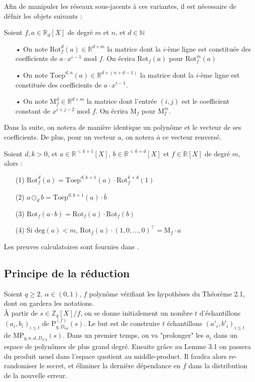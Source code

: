 \documentclass[11pt,a4paper]{article}
\begin{document}
Afin de manipuler les réseaux sous-jacents à ces variantes, il est nécessaire de défnir les objets suivants : 

\begin{defin} Soient $f,a\in \mathbb{R}_d[X]$ de degré $m$ et $n$, et $d \in \mathbb{N}$
\begin{enumerate}
\item[•] On note $\text{Rot}^d_f(a) \in \mathbb{R}^{d\times m}$ la matrice dont la $i$-ème ligne est constituée des coefficients de $a\cdot x^{i-1}\text{ mod } f$. On écrira $\text{Rot}_f(a)$ pour  $\text{Rot}^m_f(a)$
\item[•] On note $\text{Toep}^{d,n}(a) \in \mathbb{R}^{d\times(n+d-1)}$ la matrice dont la $i$-ème ligne est constituée des coefficients de $a\cdot x^{i-1}$.
\item[•] On note $\text{M}_f^d \in \mathbb{R}^{d\times m}$ la matrice dont l'entrée $(i,j)$ est le coefficient constant de $x^{i+j-2}\text{ mod }f$. On écrira $\text{M}_f$ pour  $\text{M}_f^m$.
\end{enumerate}
\end{defin}


Dans la suite, on notera de manière identique un polynôme et le vecteur de ses coefficients. De plus, pour un vecteur $a$, on notera $\bar a$ ce vecteur renversé. \\
\begin{lemma} Soient $d,k >0$, et $a \in \mathbb{R}^{<k+1}[X]$, $b \in \mathbb{R}^{<k+d}[X]$ et $f \in \mathbb{R}[X]$ de degré $m$, alors :
\begin{enumerate}
\item[(1)]$\text{Rot}^d_f(a) = \text{Toep}^{d,k+1}(a)\cdot\text{Rot}^{k+d}_f(1)$
\item[(2)] $a\odot_d b = \overline{\text{Toep}^{d,k+1}(a)\cdot \bar{b}}$
\item[(3)] $\text{Rot}_f(a\cdot b)=\text{Rot}_f(a)\cdot\text{Rot}_f(b)$
\item[(4)] Si $\text{deg}(a) < m$, $\text{Rot}_f(a)\cdot(1,0,\dots,0)^\top = \text{M}_f\cdot a$
\end{enumerate}
\end{lemma}
Les preuves calculatoires sont fournies dans \cite{mplwe}.

\subsection{Principe de la réduction}
Soient $q \geq 2$, $\alpha \in (0,1)$, $f$ polynôme vérifiant les hypothèses du Théorème 2.1, dont on gardera les notations. \\
 À partir de $s\in \mathbb{Z}_q[X]/f$, on se donne initialement un nombre $t$ d'échantillons $(a_i,b_i)_{i\leq t}$ de $\text{P}^{(f)}_{q,D_{\alpha q}}(s)$. Le but est de construire $t$ échantillons $(a'_i,b'_i)_{i\leq t}$ de $\text{MP}_{q,n,d,D_{\alpha'q}}(s)$. Dans un premier temps, on va "prolonger" les $a_i$ dans un espace de polynômes de plus grand degré. Ensuite grâce au Lemme 3.1 on passera du produit usuel dans l'espace quotient au middle-product. Il faudra alors re-randomiser le secret, et éliminer la dernière dépendance en $f$ dans la distribution de la nouvelle erreur. \\
\end{document}
